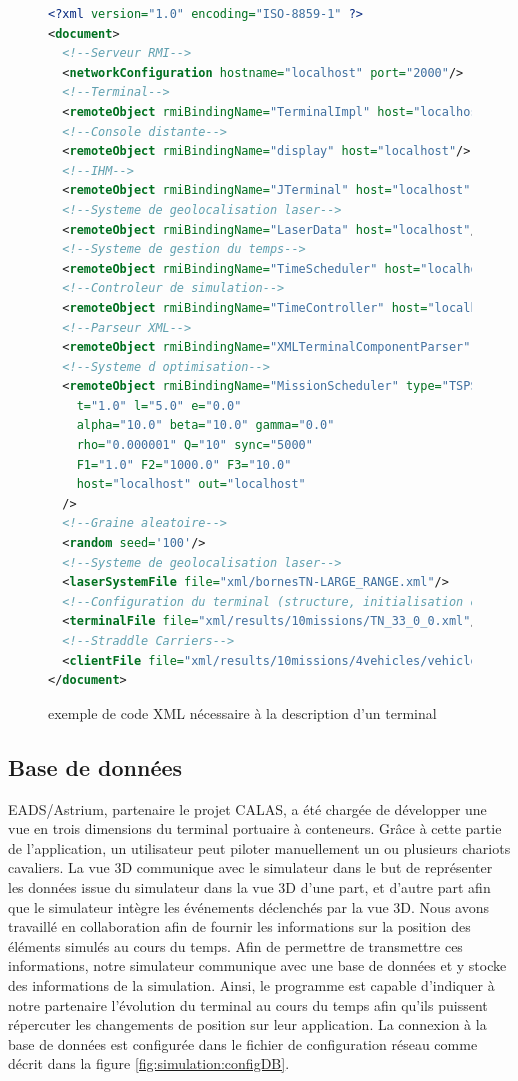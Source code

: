 \begin{figure}[h]
 
\begin{lstlisting}[language=XML]
<?xml version="1.0" encoding="ISO-8859-1" ?>
<document>
  <!--Serveur RMI-->
  <networkConfiguration hostname="localhost" port="2000"/>
  <!--Terminal-->
  <remoteObject rmiBindingName="TerminalImpl" host="localhost"/>
  <!--Console distante-->
  <remoteObject rmiBindingName="display" host="localhost"/>
  <!--IHM-->
  <remoteObject rmiBindingName="JTerminal" host="localhost" id="JTerminal1"/>
  <!--Systeme de geolocalisation laser-->
  <remoteObject rmiBindingName="LaserData" host="localhost"/>
  <!--Systeme de gestion du temps-->
  <remoteObject rmiBindingName="TimeScheduler" host="localhost"/>
  <!--Controleur de simulation-->
  <remoteObject rmiBindingName="TimeController" host="localhost"/>
  <!--Parseur XML-->
  <remoteObject rmiBindingName="XMLTerminalComponentParser" host="localhost"/>
  <!--Systeme d optimisation-->
  <remoteObject rmiBindingName="MissionScheduler" type="TSPScheduler"
    t="1.0" l="5.0" e="0.0" 
    alpha="10.0" beta="10.0" gamma="0.0" 
    rho="0.000001" Q="10" sync="5000" 
    F1="1.0" F2="1000.0" F3="10.0"
    host="localhost" out="localhost"
  />
  <!--Graine aleatoire-->
  <random seed='100'/>
  <!--Systeme de geolocalisation laser-->
  <laserSystemFile file="xml/bornesTN-LARGE_RANGE.xml"/>
  <!--Configuration du terminal (structure, initialisation et evenements)-->
  <terminalFile file="xml/results/10missions/TN_33_0_0.xml"/>
  <!--Straddle Carriers-->
  <clientFile file="xml/results/10missions/4vehicles/vehicles-4.xml"/>
</document>
\end{lstlisting}
\caption{exemple de code XML nécessaire à la description d'un terminal}
\label{fig:simulation:descriptionTerminal}
\end{figure}

\subsection{Base de données}

EADS/Astrium, partenaire le projet CALAS, a été chargée de développer une vue en trois dimensions du terminal portuaire à conteneurs. Grâce à cette partie de l'application, un utilisateur peut piloter manuellement un ou plusieurs chariots cavaliers. La vue 3D communique avec le simulateur dans le but de représenter les données issue du simulateur dans la vue 3D d'une part, et d'autre part afin que le simulateur intègre les événements déclenchés par la vue 3D.
Nous avons travaillé en collaboration afin de fournir les informations sur la position des éléments simulés au cours du temps. Afin de permettre de transmettre ces informations, notre simulateur communique avec une base de données et y stocke des informations de la simulation. Ainsi, le programme est capable d'indiquer à notre partenaire l'évolution du terminal au cours du temps afin qu'ils puissent répercuter les changements de position sur leur application. La connexion à la base de données est configurée dans le fichier de configuration réseau comme décrit dans la figure \ref{fig:simulation:configDB}.

